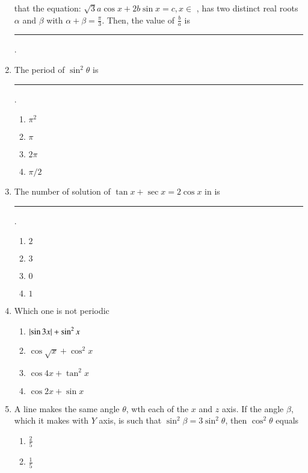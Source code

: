 \begin{enumerate}[label=\thesubsection.\arabic*,ref=\thesubsection.\theenumi]
that the equation:
%
$\sqrt{3} a\cos x+2b\sin x = c,x\in$ 
, has two distinct real roots $\alpha$ and $\beta$ with $\alpha+\beta=\frac{\pi}{3}$. Then, the value of $\frac{b}{a}$  is \rule{1cm}{0.1pt}.
\hfill{}
\item The period of $\sin^2 \theta$  is \rule{1cm}{0.1pt}.\hfill{} 
\begin{multicols}{4}
\begin{enumerate}
\item $\pi^2$
\columnbreak
\item $\pi$
\columnbreak
\item $2\pi$
\columnbreak
\item $\pi/2$
\end{enumerate}
\end{multicols}
\item The number of solution of $\tan x + \sec x=2\cos x$ in   is \rule{1cm}{0.1pt}.\hfill{} 
\begin{multicols}{4}
\begin{enumerate}
\item $2$
\columnbreak
\item $3$
\columnbreak
\item $0$
\columnbreak
\item $1$
\end{enumerate}
\end{multicols}
\item Which one is not periodic \hfill{}
\begin{multicols}{4} 
\begin{enumerate}
\item $\left\vert\sin3x\right\vert+\sin^2 x$
\item $\cos\sqrt{x}+\cos^2 x$
\columnbreak
\item $\cos4x+\tan^2 x$
\item $\cos2x+\sin x$
\end{enumerate}
\end{multicols}
\item A line makes the same angle $\theta$, wth each of the $x$ and $z$ axis. 
If the angle $\beta$, which it makes with $Y$ axis, is such that
$\sin^2 \beta=3\sin^2 \theta$, then $\cos^2 \theta$ equals \hfill{}
\begin{multicols}{4} 
\begin{enumerate}
\item $\frac{2}{5}$
\item $\frac{1}{5}$
\columnbreak

\end{enumerate}
\end{multicols}
\end{enumerate}

